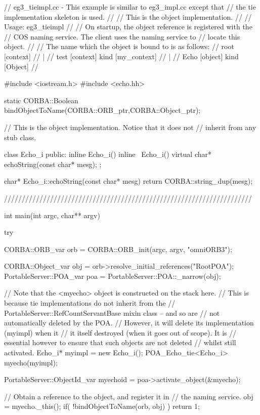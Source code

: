 \documentclass[11pt,twoside,a4paper]{book}
\begin{document}
\begin{cxxlisting}
// eg3_tieimpl.cc - This example is similar to eg3_impl.cc except that
//                  the tie implementation skeleton is used.
//
//               This is the object implementation.
//
// Usage: eg3_tieimpl
//
//        On startup, the object reference is registered with the 
//        COS naming service. The client uses the naming service to
//        locate this object.
//
//        The name which the object is bound to is as follows:
//              root  [context]
//               |
//              test  [context] kind [my_context]
//               |
//              Echo  [object]  kind [Object]
//

#include <iostream.h>
#include <echo.hh>

static CORBA::Boolean bindObjectToName(CORBA::ORB_ptr,CORBA::Object_ptr);

// This is the object implementation.  Notice that it does not
// inherit from any stub class.

class Echo_i {
public:
  inline Echo_i() {}
  inline ~Echo_i() {}
  virtual char* echoString(const char* mesg);
};

char* Echo_i::echoString(const char* mesg)
{
  return CORBA::string_dup(mesg);
}

//////////////////////////////////////////////////////////////////////

int main(int argc, char** argv)
{
  try {
    CORBA::ORB_var orb = CORBA::ORB_init(argc, argv, "omniORB3");

    CORBA::Object_var obj = orb->resolve_initial_references("RootPOA");
    PortableServer::POA_var poa = PortableServer::POA::_narrow(obj);

    // Note that the <myecho> object is constructed on the stack here.
    // This is because tie implementations do not inherit from the
    // PortableServer::RefCountServantBase mixin class -- and so are
    // not automatically deleted by the POA.
    //  However, it will delete its implementation (myimpl) when it
    // it itself destroyed (when it goes out of scope).  It is
    // essential however to ensure that such objects are not deleted
    // whilst still activated.
    Echo_i* myimpl = new Echo_i();
    POA_Echo_tie<Echo_i> myecho(myimpl);

    PortableServer::ObjectId_var myechoid = poa->activate_object(&myecho);

    // Obtain a reference to the object, and register it in
    // the naming service.
    obj = myecho._this();
    if( !bindObjectToName(orb, obj) )
      return 1;

}}
\end{cxxlisting}
\end{document}

